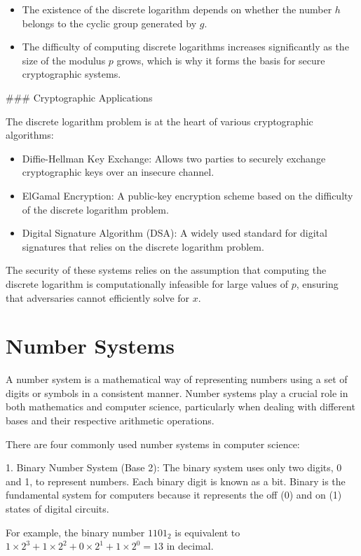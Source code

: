 \documentclass[10pt,a4paper]{article}
\begin{document}
\begin{itemize}
    \item The existence of the discrete logarithm depends on whether the number \(h\) belongs to the cyclic group generated by \(g\).
    \item The difficulty of computing discrete logarithms increases significantly as the size of the modulus \(p\) grows, which is why it forms the basis for secure cryptographic systems.
\end{itemize}

### Cryptographic Applications

The discrete logarithm problem is at the heart of various cryptographic algorithms:
\begin{itemize}
    \item Diffie-Hellman Key Exchange: Allows two parties to securely exchange cryptographic keys over an insecure channel.
    \item ElGamal Encryption: A public-key encryption scheme based on the difficulty of the discrete logarithm problem.
    \item Digital Signature Algorithm (DSA): A widely used standard for digital signatures that relies on the discrete logarithm problem.
\end{itemize}

The security of these systems relies on the assumption that computing the discrete logarithm is computationally infeasible for large values of \(p\), ensuring that adversaries cannot efficiently solve for \(x\).


\section*{Number Systems}

A number system is a mathematical way of representing numbers using a set of digits or symbols in a consistent manner. Number systems play a crucial role in both mathematics and computer science, particularly when dealing with different bases and their respective arithmetic operations.

There are four commonly used number systems in computer science:

1. Binary Number System (Base 2):
   The binary system uses only two digits, 0 and 1, to represent numbers. Each binary digit is known as a bit. Binary is the fundamental system for computers because it represents the off (0) and on (1) states of digital circuits.
   
   For example, the binary number \(1101_2\) is equivalent to \(1 \times 2^3 + 1 \times 2^2 + 0 \times 2^1 + 1 \times 2^0 = 13\) in decimal.
\end{document}
